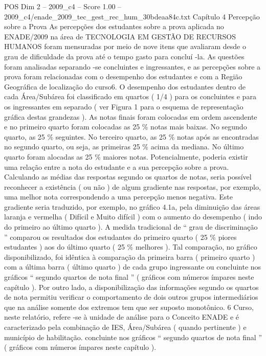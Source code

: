 \begin{textsample}{POS Dim 2 – 2009\_c4 – Score 1.00 – 2009\_c4/enade\_2009\_tec\_gest\_rec\_hum\_30bdeaa84c.txt}  \label{ex:f2_pos_201}
Capítulo 4 Percepção sobre a Prova As percepções dos estudantes sobre a prova aplicada no ENADE/2009 na área de TECNOLOGIA EM GESTÃO DE RECURSOS HUMANOS foram mensuradas por meio de nove itens que avaliaram desde o grau de dificuldade da prova até o tempo gasto para concluí -la.
As questões foram analisadas separando -se concluintes e ingressantes, e as percepções sobre a prova foram relacionadas com o desempenho dos estudantes e com a Região Geográfica de localização do curso6.
O desempenho dos estudantes dentro de cada Área/Subárea foi classificado em quartos ( 1/4 ) para os concluintes e para os ingressantes em separado ( ver Figura 1 para o esquema de representação gráfica destas grandezas ).
As notas finais foram colocadas em ordem ascendente e no primeiro quarto foram colocadas as 25 \% notas mais baixas.
No segundo quarto, as 25 \% seguintes.
No terceiro quarto, as 25 \% notas após as encontradas no segundo quarto, ou seja, as primeiras 25 \% acima da mediana.
No último quarto foram alocadas as 25 \% maiores notas.
Potencialmente, poderia existir uma relação entre a nota do estudante e a sua percepção sobre a prova.
Calculando as médias das respostas segundo os quartos de notas, seria possível reconhecer a existência ( ou não ) de algum gradiente nas respostas, por exemplo, uma melhor nota correspondendo a uma percepção menos negativa.
Este gradiente seria traduzido, por exemplo, no gráfico 4.1a, pela diminuição das áreas laranja e vermelha ( Difícil e Muito difícil ) com o aumento do desempenho ( indo do primeiro ao último quarto ).
A medida tradicional de “ grau de discriminação ” comparou os resultados dos estudantes do primeiro quarto ( 25 \% piores estudantes ) aos do último quarto ( 25 \% melhores ).
Tal comparação, no gráfico disponibilizado, foi idêntica à comparação da primeira barra ( primeiro quarto ) com a última barra ( último quarto ) de cada grupo ingressante ou concluinte nos gráficos “ segundo quartos de nota final ” ( gráficos com números ímpares neste capítulo ).
Por outro lado, a disponibilização das informações segundo os quartos de nota permitiu verificar o comportamento de dois outros grupos intermediários que na análise somente dos extremos tem que ser suposto monotônico. 6 Curso, neste relatório, refere -se à unidade de análise para o Conceito ENADE e é caracterizado pela combinação de IES, Área/Subárea ( quando pertinente ) e município de habilitação. concluinte nos gráficos “ segundo quartos de nota final ” ( gráficos com números ímpares neste capítulo ).

\end{textsample}
